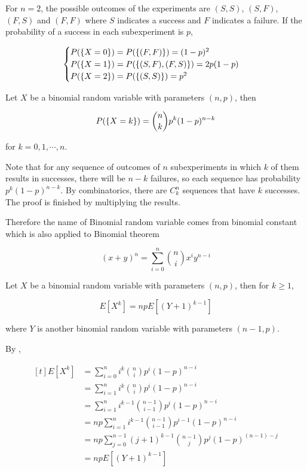 \documentclass[a4paper,12pt]{article}
\begin{document}
\begin{exm}
  For $n=2$, the possible outcomes of the experiments are $(S,S)$, $(S,F)$, $(F,S)$ and $(F,F)$ where $S$ indicates a success and $F$ indicates a failure. If the probability of a success in each subexperiment is $p$,

  $$\begin{cases}
    P(\left\{ X=0\right\})=P(\left\{ (F,F)\right\})=(1-p)^{2}\\
    P(\left\{ X=1\right\})=P(\left\{ (S,F),(F,S)\right\})=2p(1-p)\\
    P(\left\{ X=2\right\})=P(\left\{ (S,S)\right\})=p^{2}
  \end{cases}$$
\end{exm}\n

\begin{pst}
  Let $X$ be a binomial random variable with parameters $(n,p)$, then

  $$P(\left\{ X=k\right\})=\binom{n}{k}p^{k}(1-p)^{n-k}$$\s

  for $k=0,1,\cdots,n$.\n

  \prf Note that for any sequence of outcomes of $n$ subexperiments in which $k$ of them results in successes, there will be $n-k$ failures, so each sequence has probability $p^{k}(1-p)^{n-k}$. By combinatorics, there are $C_{k}^{n}$ sequences that have $k$ successes. The proof is finished by multiplying the results.
\end{pst}\n

Therefore the name of Binomial random variable comes from binomial constant which is also applied to Binomial theorem

$$(x+y)^{n}=\sum_{i=0}^{n}\binom{n}{i}x^{i}y^{n-i}$$\s

\begin{pst}
  Let $X$ be a binomial random variable with parameters $(n,p)$, then for $k\geq 1$,

  $$E[X^{k}]=npE[(Y+1)^{k-1}]$$\s

  where $Y$ is another binomial random variable with parameters $(n-1,p)$.\n

  \prf By \rdft[\sctr{3}],

  $$\begin{aligned}[t]
    E[X^{k}]&=\sum_{i=0}^{n}i^{k}\binom{n}{i}p^{i}(1-p)^{n-i}\\
    &=\sum_{i=1}^{n}i^{k}\binom{n}{i}p^{i}(1-p)^{n-i}\\
    &=\sum_{i=1}^{n}i^{k-1}\binom{n-1}{i-1}p^{i}(1-p)^{n-i}\\
    &=np\sum_{i=1}^{n}i^{k-1}\binom{n-1}{i-1}p^{i-1}(1-p)^{n-i}\\
    &=np\sum_{j=0}^{n-1}(j+1)^{k-1}\binom{n-1}{j}p^{j}(1-p)^{(n-1)-j}\\
    &=npE[(Y+1)^{k-1}]
  \end{aligned}$$
\end{pst}\n
\end{document}
